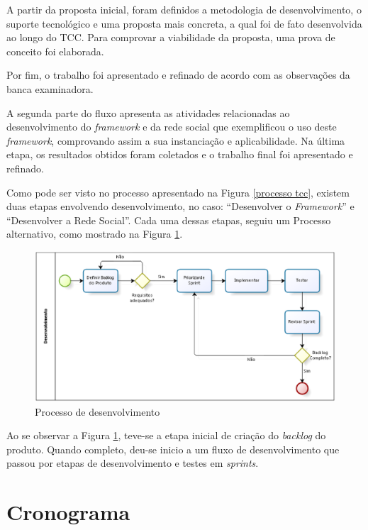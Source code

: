 A partir da proposta inicial, foram definidos a metodologia de desenvolvimento, o suporte tecnológico e uma proposta mais concreta, a qual foi de fato desenvolvida ao longo do TCC. Para comprovar a viabilidade da proposta, uma prova de conceito foi elaborada.

Por fim, o trabalho foi apresentado e refinado de acordo com as observações da banca examinadora.

A segunda parte do fluxo apresenta as atividades relacionadas ao desenvolvimento do \textit{framework} e da rede social que exemplificou o uso deste \textit{framework}, comprovando assim a sua instanciação e aplicabilidade. Na última etapa, os resultados obtidos foram coletados e o trabalho final foi apresentado e refinado.

Como pode ser visto no processo apresentado na Figura \ref{processo tcc}, existem duas etapas  envolvendo desenvolvimento, no caso: ``Desenvolver o \textit{Framework}'' e ``Desenvolver a Rede Social''. Cada uma dessas etapas, seguiu um Processo alternativo, como mostrado na Figura \ref{Processo desenvolvimento}.

\begin{figure}[h]
	\centering
	\includegraphics[scale=0.4]{figuras/metodologia/processo_desenvolvimento.eps}
	\caption{Processo de desenvolvimento}
	\label{Processo desenvolvimento}
\end{figure}

Ao se observar a Figura \ref{Processo desenvolvimento}, teve-se a etapa inicial de criação do \textit{backlog} do produto. Quando completo, deu-se inicio a um fluxo de desenvolvimento que passou por etapas de desenvolvimento e testes em \textit{sprints}.

\section{Cronograma}

